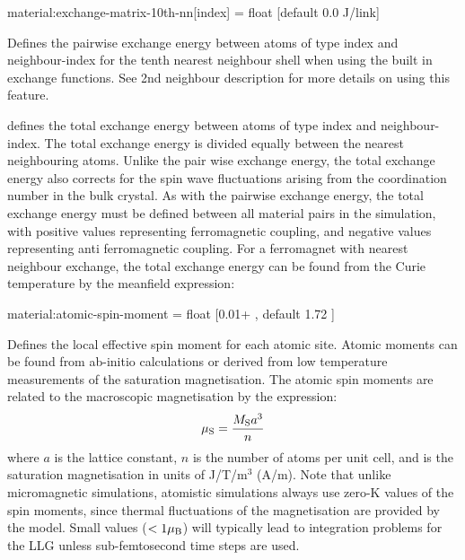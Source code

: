 {\zicf material:exchange-matrix-10th-nn[index] = float [default 0.0 J/link]}
Defines the pairwise exchange energy between atoms of type index and
neighbour-index for the tenth nearest neighbour shell when using the built in
exchange functions. See 2nd neighbour description for more details on using this feature.



defines the total exchange energy between atoms of type index  and
neighbour-index. The  total exchange energy is divided equally between the
nearest neighbouring atoms. Unlike the pair wise exchange energy, the total
exchange energy also corrects for the spin wave fluctuations arising from the
coordination number in the bulk crystal. As with the pairwise exchange energy,
the total exchange energy must be defined between all material pairs in the
simulation, with positive values representing ferromagnetic coupling, and
negative values representing anti ferromagnetic coupling. For a ferromagnet
with nearest neighbour exchange, the total exchange energy can be found from
the Curie temperature by the meanfield expression:


{\zicf material:atomic-spin-moment = float [0.01+ \muB, default 1.72 \muB]}
Defines the local effective spin moment for each atomic site. Atomic moments can be found from ab-initio calculations or derived from low temperature measurements of the saturation magnetisation. The atomic spin moments are related to the macroscopic magnetisation by the expression:
\begin{equation*}
\mu_\mathrm{S} = \frac{M_\mathrm{S} a^3}{n}
\end{equation*}
where $a$ is the lattice constant, $n$ is the number of atoms per unit cell, and \Ms is the saturation magnetisation in units of J/T/m$^3$ (A/m). Note that unlike micromagnetic simulations, atomistic simulations always use zero-K values of the spin moments, since thermal fluctuations of the magnetisation are provided by the model. Small values ($<1 \mu_\mathrm{B}$) will typically lead to integration problems for the LLG unless sub-femtosecond time steps are used.\\

